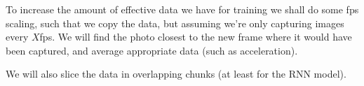 

To increase the amount of effective data we have for training we shall do some fps scaling, such that we copy the data, but assuming we're only capturing images every $X$fps. We will find the photo closest to the new frame where it would have been captured, and average appropriate data (such as acceleration).

We will also slice the data in overlapping chunks (at least for the RNN model).



